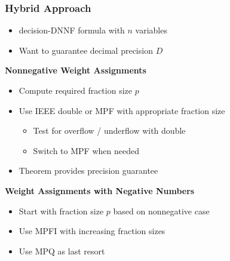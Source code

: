 \documentclass[t,pdf]{beamer}
\newcommand{\bitem}{\item[$\bullet$]}
\begin{document}
\begin{frame}

\frametitle{Hybrid Approach}

\smallskip

\begin{itemize}
\item decision-DNNF formula with $n$ variables
\item Want to guarantee decimal precision $D$
\end{itemize}

\medskip

\textbf{Nonnegative Weight Assignments}

\smallskip

\begin{itemize}
\item Compute required fraction size $p$
\item Use IEEE double or MPF with appropriate fraction size
  \begin{itemize}
    \bitem Test for overflow / underflow with double
    \bitem Switch to MPF when needed
  \end{itemize}
\item Theorem provides precision guarantee
\end{itemize}

\medskip

\textbf{Weight Assignments with Negative Numbers}

\smallskip

\begin{itemize}
\item Start with fraction size $p$ based on nonnegative case
\item Use MPFI with increasing fraction sizes
\item Use MPQ as last resort
\end{itemize}

\end{frame}
\end{document}
